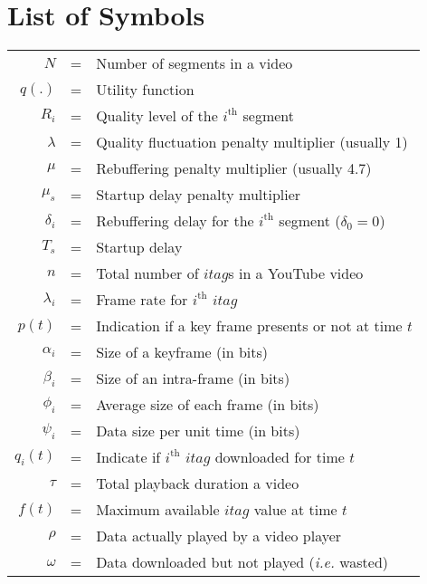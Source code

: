 \chapter*{List of Symbols}

\begin{table}[h!]
\begin{tabular}{rcl}
	$N$ &=& Number of segments in a video \\
	$q(.)$ &=& Utility function \\
	$R_i$ &=& Quality level of the $i^\text{th}$ segment \\
	$\lambda$ &=& Quality fluctuation penalty multiplier (usually 1) \\
	$\mu$ &=& Rebuffering penalty multiplier (usually 4.7) \\
	$\mu_s$ &=& Startup delay penalty multiplier \\
	$\delta_i$ &=& Rebuffering delay for the $i^\text{th}$ segment ($\delta_0 = 0$) \\
	$T_s$ &=& Startup delay \\
	$n$ &=& Total number of $itag$s in a YouTube video\\
	$\lambda_i$ &=& Frame rate for $i^\text{th}$ $itag$ \\
	$p(t)$ &=& Indication if a key frame presents or not at time $t$ \\
	$\alpha_i$ &=& Size of a keyframe (in bits) \\
	$\beta_i$ &=& Size of an intra-frame (in bits) \\
	$\phi_i$ &=& Average size of each frame (in bits) \\
	$\psi_i$ &=& Data size per unit time (in bits) \\
	$q_i(t)$ &=& Indicate if $i^\text{th}$ $itag$ downloaded for time $t$ \\
	$\tau$ &=& Total playback duration a video \\
	$f(t)$ &=& Maximum available $itag$ value at time $t$ \\
	$\rho$ &=& Data actually played by a video player\\
	$\omega$ &=& Data downloaded but not played ({\it i.e.} wasted) \\

\end{tabular}
\end{table}
